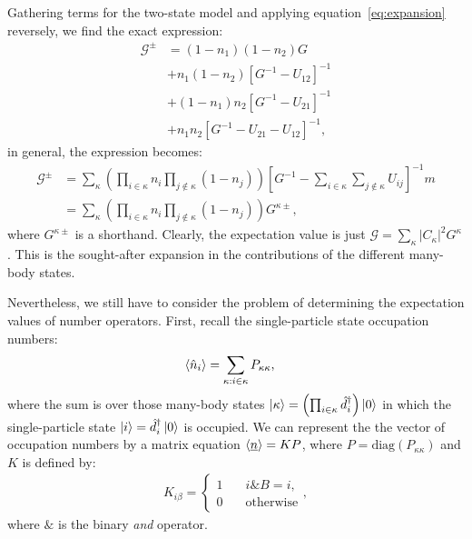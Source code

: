 \documentclass{article}
\begin{document}
\begin{multicols}{2}
        Gathering terms for the two-state model and applying equation~\ref{eq:expansion} reversely, we find the exact expression:
        \begin{align}\label{eq:mbgf2}
            \mathscr{G}^\pm &= (1-n_1)(1-n_2) G \\ &+ n_1 (1-n_2) \left[ G^{-1} - U_{12}\right]^{-1} \nonumber\\ &+ (1-n_1)n_2 \left[ G^{-1} - U_{21}\right]^{-1} \nonumber\\ &+ n_1 n_2\left[ G^{-1} - U_{21} - U_{12}\right]^{-1} \nonumber,
        \end{align}
        in general, the expression becomes:
        \begin{align}\label{eq:mbgf}
        \mathscr{G}^\pm &= \sum_\kappa \left(\prod_{i\in\kappa} n_i \prod_{j\notin \kappa} (1-n_j) \right) \left[G^{-1} - \sum_{i\in\kappa} \sum_{j\notin \kappa} U_{ij}\right]^{-1}m \\
        \nonumber &= \sum_\kappa \left(\prod_{i\in\kappa} n_i \prod_{j\notin \kappa} (1-n_j) \right) G^{\kappa\pm},
        \end{align}
        where $G^{\kappa\pm}$ is a shorthand. Clearly, the expectation value is just $\mathscr{G} = \sum_\kappa \left|C_\kappa\right|^2 G^{\kappa}$. This is the sought-after expansion in the contributions of the different many-body states.
                  
        Nevertheless, we still have to consider the problem of determining the expectation values of number operators. First, recall the single-particle state occupation numbers:
        \begin{align*}
            \braket{\hat{n}_i} &= \sum_{\kappa: i\in \kappa} P_{\kappa\kappa},
        \end{align*}
        where the sum is over those many-body states $\ket{\kappa}=\left(\prod_{i\in\kappa}\hat{d}_i^\dagger \right)\ket{0}$ in which the single-particle state $\ket{i} = \hat{d}_i^\dagger \ket{0}$ is occupied. We can represent the the vector of occupation numbers by a matrix equation $\braket{\underline{n}} = KP$, where $P=\text{diag}(P_{\kappa\kappa})$ and $K$ is defined by:
        \begin{align}
            K_{i\beta} = \begin{cases} 1 & \quad i\&B=i, \\ 0 & \quad\text{otherwise}\end{cases},
        \label{eq:kmatrix}\end{align}
        where $\&$ is the binary \emph{and} operator.
        

\end{multicols}
\end{document}
